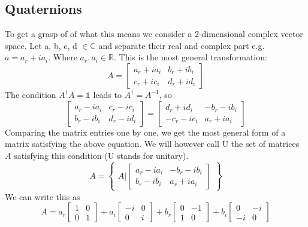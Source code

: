 \documentclass[11pt]{article}
\begin{document}
\subsection{Quaternions}
To get a grasp of of what this means we consider a 2-dimensional complex vector space.
Let a, b, c, d $\in{\mathbb{C}}$ and separate their real and complex part e.g. $a = a_r + ia_i$.
Where $a_r, a_i \in{\mathbb{R}}$. This is the most general transformation:
\begin{equation} A =
    \begin{bmatrix}
        a_r + ia_i & b_r + ib_i \\
        c_r + ic_i & d_r + id_i
    \end{bmatrix}    
\end{equation}
The condition $A^\dagger A = \mathbb{1}$ leads to $A^\dagger = A^{-1}$, so
\begin{equation}
    \begin{bmatrix}
        a_r - ia_i & c_r - ic_i \\
        b_r - ib_i & d_r - id_i
    \end{bmatrix} =
    \begin{bmatrix}
        d_r + id_i & -b_r - ib_i \\
        -c_r - ic_i & a_r + ia_i
    \end{bmatrix}    
\end{equation}
Comparing the matrix entries one by one, we get the most general form of a matrix
satisfying the above equation. We will however call U the set of matrices $A$ 
satisfying this condition (U stands for unitary).
\begin{equation} A =
    \begin{Bmatrix}A|\begin{bmatrix}
        a_r - ia_i & -b_r - ib_i \\
        b_r - ib_i & a_r + ia_i
    \end{bmatrix}\end{Bmatrix}
\end{equation}
We can write this as
\begin{equation} A = a_r
    \begin{bmatrix}
        1 & 0 \\ 0 & 1
    \end{bmatrix} + a_i
    \begin{bmatrix}
        -i & 0 \\ 0 & i
    \end{bmatrix} + b_r
    \begin{bmatrix}
        0 & -1 \\ 1 & 0
    \end{bmatrix} + b_i
    \begin{bmatrix}
        0 & -i \\ -i & 0
    \end{bmatrix}
\end{equation}
\end{document}
